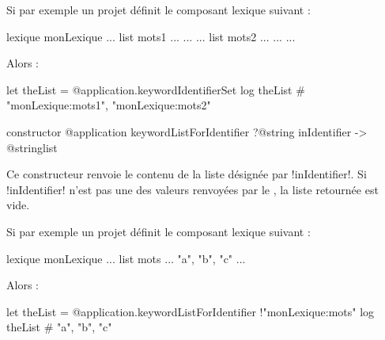 Si par exemple un projet définit le composant lexique suivant :

\begin{galgas}
lexique monLexique {
  ...
  list mots1 ... { ... }
  ...
  list mots2 ... { ... }
  ...
}
\end{galgas}

Alors :
\begin{galgas}
let theList = @application.keywordIdentifierSet
log theList # "monLexique:mots1", "monLexique:mots2"
\end{galgas}






\begin{galgasbox}
constructor @application keywordListForIdentifier
  ?@string inIdentifier
  -> @stringlist
\end{galgasbox}


Ce constructeur renvoie le contenu de la liste désignée par \ggs!inIdentifier!. Si \ggs!inIdentifier! n'est pas une des valeurs renvoyées par le , la liste retournée est vide.


Si par exemple un projet définit le composant lexique suivant :

\begin{galgas}
lexique monLexique {
  ...
  list mots ... { "a", "b", "c" }
  ...
}
\end{galgas}

Alors :
\begin{galgas}
let theList = @application.keywordListForIdentifier {!"monLexique:mots"}
log theList # "a", "b", "c"
\end{galgas}


